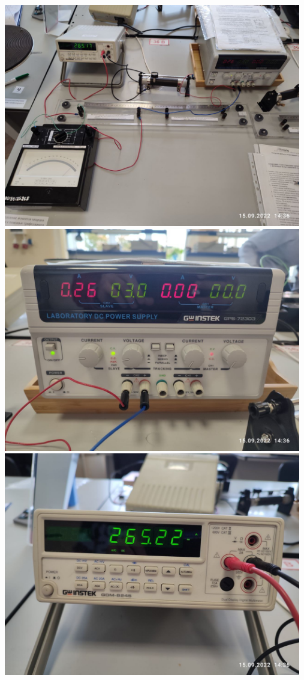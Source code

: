 \documentclass[a4paper, 12pt]{article}
\begin{document}
\includegraphics[width=13cm]{A (3).jpg}\\
\includegraphics[width=13cm]{A (4).jpg}\\
\includegraphics[width=13cm]{A (5).jpg}\\
\end{document}

